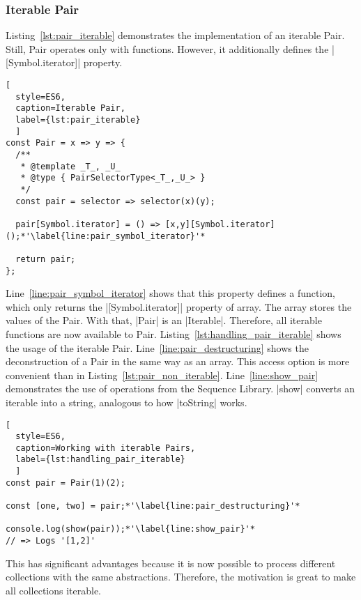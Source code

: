 \subsubsection{Iterable Pair}
\label{subsub:Iterable Pair}
Listing~\ref{lst:pair_iterable} demonstrates the implementation of an iterable 
Pair. Still, Pair operates only with functions. However, it additionally defines the
|[Symbol.iterator]| property.

\begin{lstlisting}[
  style=ES6, 
  caption=Iterable Pair,
  label={lst:pair_iterable}
  ]
const Pair = x => y => {
  /**
   * @template _T_, _U_
   * @type { PairSelectorType<_T_,_U_> }
   */
  const pair = selector => selector(x)(y);

  pair[Symbol.iterator] = () => [x,y][Symbol.iterator]();*'\label{line:pair_symbol_iterator}'*

  return pair;
};
\end{lstlisting}

Line~\ref{line:pair_symbol_iterator} shows that 
this property defines a function, which only returns the |[Symbol.iterator]| 
property of array. The array stores the values of the Pair. With that, |Pair|
is an |Iterable|. Therefore, all iterable functions are now available to Pair.
Listing~\ref{lst:handling_pair_iterable} shows the usage of the iterable Pair. 
Line~\ref{line:pair_destructuring} shows the deconstruction of a Pair in the same way as an array. 
This access option is more convenient than in Listing~\ref{lst:pair_non_iterable}. 
Line~\ref{line:show_pair} demonstrates the use of operations from the Sequence 
Library. |show| converts an iterable into a string, analogous to how |toString|
works.

\begin{lstlisting}[
  style=ES6, 
  caption=Working with iterable Pairs,
  label={lst:handling_pair_iterable}
  ]
const pair = Pair(1)(2);

const [one, two] = pair;*'\label{line:pair_destructuring}'*

console.log(show(pair));*'\label{line:show_pair}'*
// => Logs '[1,2]'
\end{lstlisting}

This has significant advantages because it is now possible to process different 
collections with the same abstractions. Therefore, the motivation is great to 
make all collections iterable.

